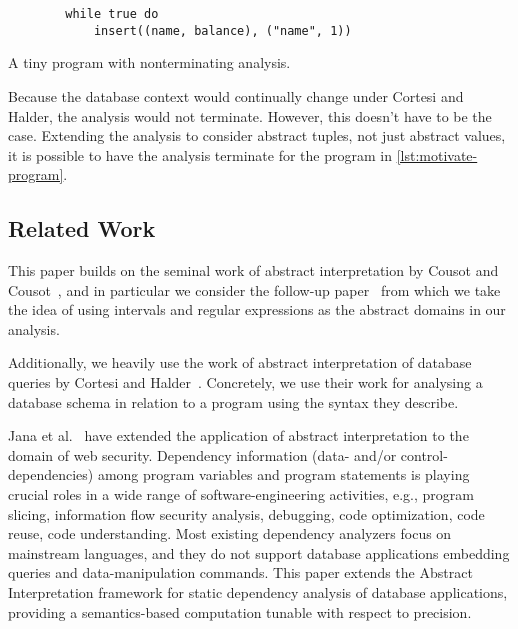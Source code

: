 \begin{listing}
    \begin{verbatim}
        while true do
            insert((name, balance), ("name", 1))
    \end{verbatim}
    \caption{A tiny program with nonterminating analysis.}
    \label{lst:motivate-program}
\end{listing}


Because the database context would continually change under Cortesi and Halder, the analysis would not terminate.
However, this doesn't have to be the case.
Extending the analysis to consider abstract tuples, not just abstract values, it is possible to have the analysis terminate for the program in \autoref{lst:motivate-program}.


\subsection{Related Work}\label{subsec:related-work}
This paper builds on the seminal work of abstract interpretation by Cousot and Cousot~\cite{cousot_abstract_1977}, and in particular we consider the follow-up paper~\cite{cousot_abstract_1996} from which we take the idea of using intervals and regular expressions as the abstract domains in our analysis.

Additionally, we heavily use the work of abstract interpretation of database queries by Cortesi and Halder~\cite{halder_abstract_2012}.
Concretely, we use their work for analysing a database schema in relation to a program using the syntax they describe.

Jana et al.~\cite{jana_extending_2020} have extended the application of abstract interpretation to the domain of web security.
Dependency information (data- and/or control-dependencies) among program variables and program statements is playing crucial roles in a wide range of software-engineering activities, e.g., program slicing, information flow security analysis, debugging, code optimization, code reuse, code understanding.
Most existing dependency analyzers focus on mainstream languages, and they do not support database applications embedding queries and data-manipulation commands.
This paper extends the Abstract Interpretation framework for static dependency analysis of database applications, providing a semantics-based computation tunable with respect to precision.

